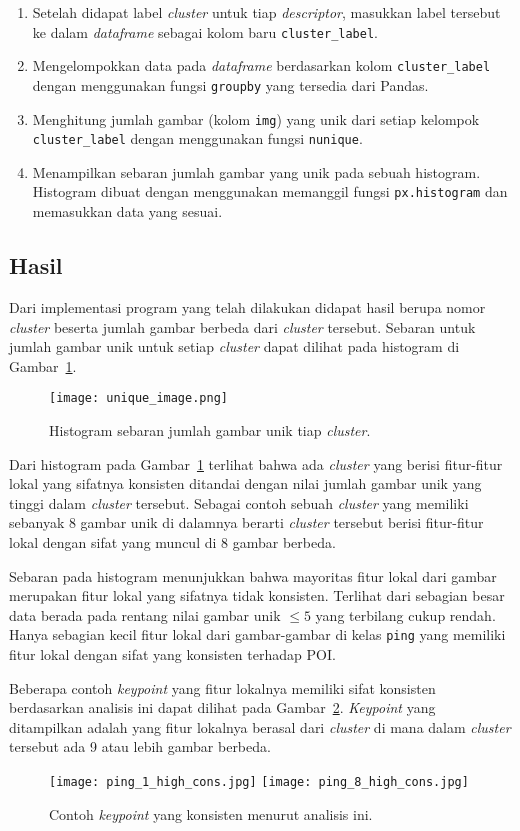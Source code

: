 \begin{enumerate}
	\item Setelah didapat label \textit{cluster} untuk tiap \textit{descriptor}, masukkan label tersebut ke dalam \textit{dataframe} sebagai kolom baru \texttt{cluster\_label}.
	\item Mengelompokkan data pada \textit{dataframe} berdasarkan kolom \texttt{cluster\_label} dengan menggunakan fungsi \texttt{groupby} yang tersedia dari Pandas.
	\item Menghitung jumlah gambar (kolom \texttt{img}) yang unik dari setiap kelompok \texttt{cluster\_label} dengan menggunakan fungsi \texttt{nunique}.
	\item Menampilkan sebaran jumlah gambar yang unik pada sebuah histogram. Histogram dibuat dengan menggunakan memanggil fungsi \texttt{px.histogram} dan memasukkan data yang sesuai.
\end{enumerate}

\subsection{Hasil}
Dari implementasi program yang telah dilakukan didapat hasil berupa nomor \textit{cluster} beserta jumlah gambar berbeda dari \textit{cluster} tersebut. Sebaran untuk jumlah gambar unik untuk setiap \textit{cluster} dapat dilihat pada histogram di Gambar~\ref{fig:unique_image}.
\begin{figure}[H]
	\centering
	\texttt{[image: unique\_image.png]}
	\caption{Histogram sebaran jumlah gambar unik tiap \textit{cluster}.}
	\label{fig:unique_image}
\end{figure}
Dari histogram pada Gambar~\ref{fig:unique_image} terlihat bahwa ada \textit{cluster} yang berisi fitur-fitur lokal yang sifatnya konsisten ditandai dengan nilai jumlah gambar unik yang tinggi dalam \textit{cluster} tersebut. Sebagai contoh sebuah \textit{cluster} yang memiliki sebanyak 8 gambar unik di dalamnya berarti \textit{cluster} tersebut berisi fitur-fitur lokal dengan sifat yang muncul di 8 gambar berbeda. 

Sebaran pada histogram menunjukkan bahwa mayoritas fitur lokal dari gambar merupakan fitur lokal yang sifatnya tidak konsisten. Terlihat dari sebagian besar data berada pada rentang nilai gambar unik $\leq5$ yang terbilang cukup rendah. Hanya sebagian kecil fitur lokal dari gambar-gambar di kelas \texttt{ping} yang memiliki fitur lokal dengan sifat yang konsisten terhadap POI.

Beberapa contoh \textit{keypoint} yang fitur lokalnya memiliki sifat konsisten berdasarkan analisis ini dapat dilihat pada Gambar~\ref{fig:keypoint_konsisten}. \textit{Keypoint} yang ditampilkan adalah yang fitur lokalnya berasal dari \textit{cluster} di mana dalam \textit{cluster} tersebut ada 9 atau lebih gambar berbeda.
\begin{figure}[H]
	\centering
	\texttt{[image: ping\_1\_high\_cons.jpg]}
	\texttt{[image: ping\_8\_high\_cons.jpg]}
	\caption{Contoh \textit{keypoint} yang konsisten menurut analisis ini.}
	\label{fig:keypoint_konsisten}
\end{figure}

